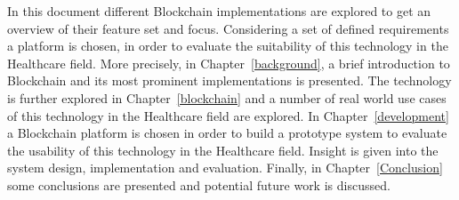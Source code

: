 In this document different Blockchain implementations are explored to get an
overview of their feature set and focus. Considering a set of defined
requirements a platform is chosen, in order to evaluate the suitability of this
technology in the Healthcare field. More precisely, in
Chapter~\ref{background}, a brief introduction to Blockchain and its most
prominent implementations is presented. The technology is further explored in
Chapter~\ref{blockchain} and a number of real world use cases of this
technology in the Healthcare field are explored.  In Chapter~\ref{development}
a Blockchain platform is chosen in order to build a prototype system to
evaluate the usability of this technology in the Healthcare field. Insight is
given into the system design, implementation and evaluation. Finally, in
Chapter~\ref{Conclusion} some conclusions are presented and potential future
work is discussed.
